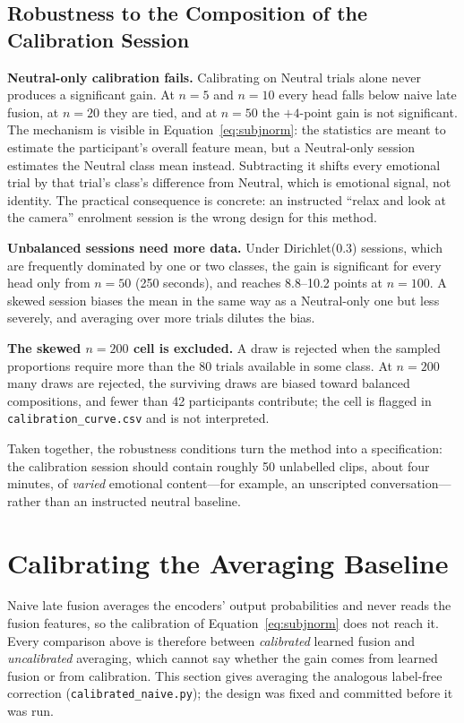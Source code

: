 \subsection{Robustness to the Composition of the Calibration Session}
\label{sec:cal_robustness}

\textbf{Neutral-only calibration fails.} Calibrating on Neutral trials alone never
produces a significant gain. At $n = 5$ and $n = 10$ every head falls below naive late
fusion, at $n = 20$ they are tied, and at $n = 50$ the $+4$-point gain is not
significant. The mechanism is visible in Equation~\ref{eq:subjnorm}: the statistics
are meant to estimate the participant's overall feature mean, but a Neutral-only
session estimates the Neutral class mean instead. Subtracting it shifts every
emotional trial by that trial's class's difference from Neutral, which is emotional
signal, not identity. The practical consequence is concrete: an instructed ``relax
and look at the camera'' enrolment session is the wrong design for this method.

\textbf{Unbalanced sessions need more data.} Under Dirichlet(0.3) sessions, which are
frequently dominated by one or two classes, the gain is significant for every head
only from $n = 50$ (250 seconds), and reaches 8.8--10.2 points at $n = 100$. A
skewed session biases the mean in the same way as a Neutral-only one but less
severely, and averaging over more trials dilutes the bias.

\textbf{The skewed $n = 200$ cell is excluded.} A draw is rejected when the sampled
proportions require more than the 80 trials available in some class. At $n = 200$ many
draws are rejected, the surviving draws are biased toward balanced compositions, and
fewer than 42 participants contribute; the cell is flagged in
\texttt{calibration\_curve.csv} and is not interpreted.

Taken together, the robustness conditions turn the method into a specification: the
calibration session should contain roughly 50 unlabelled clips, about four minutes,
of \emph{varied} emotional content---for example, an unscripted conversation---rather
than an instructed neutral baseline.

\section{Calibrating the Averaging Baseline}
\label{sec:cal_baseline}

Naive late fusion averages the encoders' output probabilities and never reads the
fusion features, so the calibration of Equation~\ref{eq:subjnorm} does not reach it.
Every comparison above is therefore between \emph{calibrated} learned fusion and
\emph{uncalibrated} averaging, which cannot say whether the gain comes from learned
fusion or from calibration. This section gives averaging the analogous label-free
correction (\texttt{calibrated\_naive.py}); the design was fixed and committed before
it was run.

